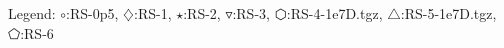 Legend: {\color{NavyBlue}$\circ$}:RS-0p5, {\color{Magenta}$\diamondsuit$}:RS-1, {\color{Orange}$\star$}:RS-2, {\color{CornflowerBlue}$\triangledown$}:RS-3, {\color{red}$\varhexagon$}:RS-4-1e7D.tgz, {\color{YellowGreen}$\triangle$}:RS-5-1e7D.tgz, {\color{cyan}$\pentagon$}:RS-6